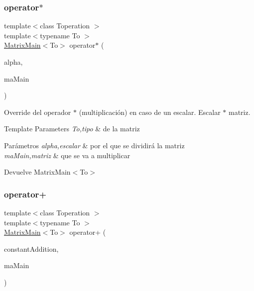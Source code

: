 \subsubsection{\texorpdfstring{operator$\ast$}{operator*}}
{\footnotesize\ttfamily template$<$class Toperation $>$ \\
template$<$typename To $>$ \\
\hyperlink{classMatrixMain}{Matrix\+Main}$<$To$>$ operator$\ast$ (\begin{DoxyParamCaption}\item[{const double \&}]{alpha,  }\item[{const \hyperlink{classMatrixMain}{Matrix\+Main}$<$ To $>$ \&}]{ma\+Main }\end{DoxyParamCaption})\hspace{0.3cm}{\ttfamily [friend]}}



Override del operador $\ast$ (multiplicación) en caso de un escalar. Escalar $\ast$ matriz. 


\begin{DoxyTemplParams}{Template Parameters}
{\em To,tipo} & de la matriz \\
\hline
\end{DoxyTemplParams}

\begin{DoxyParams}{Parámetros}
{\em alpha,escalar} & por el que se dividirá la matriz \\
\hline
{\em ma\+Main,matriz} & que se va a multiplicar \\
\hline
\end{DoxyParams}
\begin{DoxyReturn}{Devuelve}
Matrix\+Main$<$\+To$>$ 
\end{DoxyReturn}
\mbox{\label{classMatrixMain_a83759ded6e3b7e9182b65f7ad77853a8}} 
\subsubsection{\texorpdfstring{operator+}{operator+}}
{\footnotesize\ttfamily template$<$class Toperation $>$ \\
template$<$typename To $>$ \\
\hyperlink{classMatrixMain}{Matrix\+Main}$<$To$>$ operator+ (\begin{DoxyParamCaption}\item[{const double \&}]{constant\+Addition,  }\item[{const \hyperlink{classMatrixMain}{Matrix\+Main}$<$ To $>$ \&}]{ma\+Main }\end{DoxyParamCaption})\hspace{0.3cm}{\ttfamily [friend]}}



